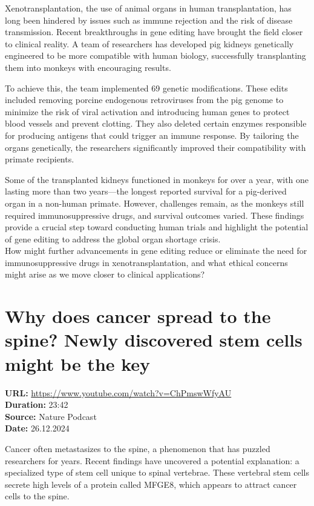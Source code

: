 \documentclass[12pt]{article}
\begin{document}
Xenotransplantation, the use of animal organs in human transplantation, has long been hindered by issues such as immune rejection and the risk of disease transmission. Recent breakthroughs in gene editing have brought the field closer to clinical reality. A team of researchers has developed pig kidneys genetically engineered to be more compatible with human biology, successfully transplanting them into monkeys with encouraging results.  

To achieve this, the team implemented 69 genetic modifications. These edits included removing porcine endogenous retroviruses from the pig genome to minimize the risk of viral activation and introducing human genes to protect blood vessels and prevent clotting. They also deleted certain enzymes responsible for producing antigens that could trigger an immune response. By tailoring the organs genetically, the researchers significantly improved their compatibility with primate recipients.  

Some of the transplanted kidneys functioned in monkeys for over a year, with one lasting more than two years—the longest reported survival for a pig-derived organ in a non-human primate. However, challenges remain, as the monkeys still required immunosuppressive drugs, and survival outcomes varied. These findings provide a crucial step toward conducting human trials and highlight the potential of gene editing to address the global organ shortage crisis.\\[5px] 
 
How might further advancements in gene editing reduce or eliminate the need for immunosuppressive drugs in xenotransplantation, and what ethical concerns might arise as we move closer to clinical applications?  


\newpage

\section{Why does cancer spread to the spine? Newly discovered stem cells might be the key}
\textbf{URL:} \url{https://www.youtube.com/watch?v=ChPmswWfyAU}\\
\textbf{Duration:} 23:42\\
\textbf{Source:} Nature Podcast\\
\textbf{Date:} 26.12.2024


Cancer often metastasizes to the spine, a phenomenon that has puzzled researchers for years. Recent findings have uncovered a potential explanation: a specialized type of stem cell unique to spinal vertebrae. These vertebral stem cells secrete high levels of a protein called MFGE8, which appears to attract cancer cells to the spine.  
\end{document}
